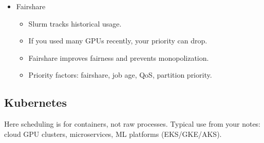 \documentclass[12pt]{article}
\begin{document}
\begin{itemize}
\item Fairshare
\begin{itemize}
\item Slurm tracks historical usage.
\item If you used many GPUs recently, your priority can drop.
\item Fairshare improves fairness and prevents monopolization.
\item Priority factors: fairshare, job age, QoS, partition priority.
\end{itemize}
\end{itemize}

\subsection{Kubernetes}
Here scheduling is for containers, not raw processes.
Typical use from your notes: cloud GPU clusters, microservices, ML platforms (EKS/GKE/AKS).
\end{document}
